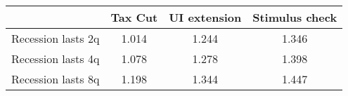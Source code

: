 \begin{tabular}{@{}lccc@{}} 
\toprule 
& Tax Cut    & UI extension    & Stimulus check    \\  \midrule 
Recession lasts 2q &1.014  & 1.244  & 1.346     \\ 
Recession lasts 4q &1.078  & 1.278  & 1.398     \\ 
Recession lasts 8q &1.198  & 1.344  & 1.447     \\ 
\end{tabular}  
